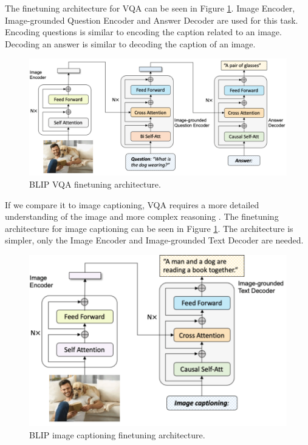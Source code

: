 \documentclass[11pt]{article}
\begin{document}
The finetuning architecture for VQA can be seen in Figure \ref{fig:vqa_example}. Image Encoder, Image-grounded Question Encoder and Answer Decoder are used for this task. Encoding questions is similar to encoding the caption related to an image. Decoding an answer is similar to decoding the caption of an image.

\begin{figure}[ht]
    \centering
    \includegraphics[width=\linewidth]{vqa_example.png}
    \caption{BLIP VQA finetuning architecture.}
    \label{fig:vqa_example}
\end{figure}

If we compare it to image captioning, VQA requires a more detailed understanding of the image and more complex reasoning \cite{antol2015vqa}. The finetuning architecture for image captioning can be seen in Figure \ref{fig:vqa_example}. The architecture is simpler, only the Image Encoder and Image-grounded Text Decoder are needed.

\begin{figure}[ht]
    \centering
    \includegraphics[width=\linewidth]{captioning_example.png}
    \caption{BLIP image captioning finetuning architecture.}
    \label{fig:captioning_example}
\end{figure}
\end{document}
